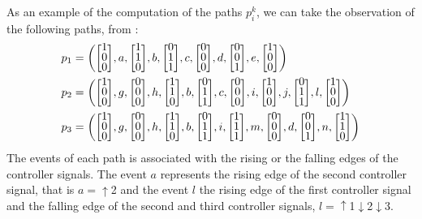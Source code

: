 As an example of the computation of the paths $p_i^k$, we can take the observation of the following
paths, from \cite{moreira2018enhanced}:
\newcommand{\colvec}[2][1]{%
  \scalebox{#1}{%
    \renewcommand{\arraystretch}{.7}%
    $\begin{bmatrix}#2\end{bmatrix}$%
  }
}
\setlength\arraycolsep{2pt}
\begin{align*}
  p_1&= \left(\colvec{1\\0\\0},a,\colvec{1\\1\\0},b,\colvec{0\\1\\1},c,\colvec{0\\0\\0},d,\colvec{0\\0\\1},e,\colvec{1\\0\\0}\right) \\
  p_2&= \left(\colvec{1\\0\\0},g,\colvec{0\\0\\0},h,\colvec{1\\1\\0},b,\colvec{0\\1\\1},c,\colvec{0\\0\\0},i,\colvec{1\\0\\0},j,\colvec{0\\1\\1},l,\colvec{1\\0\\0}\right) \\
  p_3&= \left(\colvec{1\\0\\0},g,\colvec{0\\0\\0},h,\colvec{1\\1\\0},b,\colvec{0\\1\\1},i,\colvec{1\\1\\1},m,\colvec{0\\0\\0},d,\colvec{0\\0\\1},n,\colvec{1\\1\\0}\right) \\
\end{align*}
The events of each path is associated with the rising or the falling edges of
the controller signals. The event $a$ represents the rising edge of the second
controller signal, that is $a=\uparrow$2 and the event $l$ the rising edge of the first
controller signal and the falling edge of the second
and third controller signals, $l=\uparrow$1$\downarrow$2$\downarrow$3.

